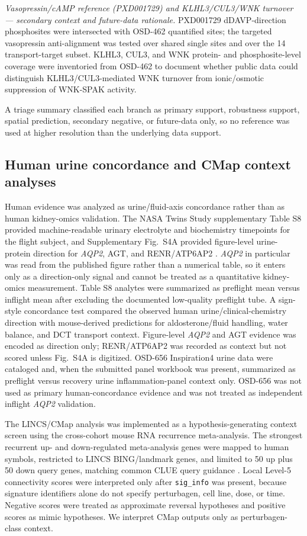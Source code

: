 \documentclass[11pt]{article}
\newcommand{\code}[1]{\texttt{#1}}
\newcommand{\gene}[1]{\textit{#1}}
\begin{document}
\emph{Vasopressin/cAMP reference (PXD001729) and KLHL3/CUL3/WNK turnover --- secondary context and future-data rationale.} PXD001729 dDAVP-direction phosphosites were intersected with OSD-462 quantified sites; the targeted vasopressin anti-alignment was tested over shared single sites and over the 14 transport-target subset. KLHL3, CUL3, and WNK protein- and phosphosite-level coverage were inventoried from OSD-462 to document whether public data could distinguish KLHL3/CUL3-mediated WNK turnover from ionic/osmotic suppression of WNK-SPAK activity.

A triage summary classified each branch as primary support, robustness support, spatial prediction, secondary negative, or future-data only, so no reference was used at higher resolution than the underlying data support.

\subsection{Human urine concordance and CMap context analyses}

Human evidence was analyzed as urine/fluid-axis concordance rather than as human kidney-omics validation. The NASA Twins Study supplementary Table S8 provided machine-readable urinary electrolyte and biochemistry timepoints for the flight subject, and Supplementary Fig.~S4A provided figure-level urine-protein direction for \gene{AQP2}, AGT, and RENR/ATP6AP2 \citep{garrettbakelman2019twins}. \gene{AQP2} in particular was read from the published figure rather than a numerical table, so it enters only as a direction-only signal and cannot be treated as a quantitative kidney-omics measurement. Table S8 analytes were summarized as preflight mean versus inflight mean after excluding the documented low-quality preflight tube. A sign-style concordance test compared the observed human urine/clinical-chemistry direction with mouse-derived predictions for aldosterone/fluid handling, water balance, and DCT transport context. Figure-level \gene{AQP2} and AGT evidence was encoded as direction only; RENR/ATP6AP2 was recorded as context but not scored unless Fig.~S4A is digitized. OSD-656 Inspiration4 urine data were cataloged and, when the submitted panel workbook was present, summarized as preflight versus recovery urine inflammation-panel context only. OSD-656 was not used as primary human-concordance evidence and was not treated as independent inflight \gene{AQP2} validation.

The LINCS/CMap analysis was implemented as a hypothesis-generating context screen using the cross-cohort mouse RNA recurrence meta-analysis. The strongest recurrent up- and down-regulated meta-analysis genes were mapped to human symbols, restricted to LINCS BING/landmark genes, and limited to 50 up plus 50 down query genes, matching common CLUE query guidance \citep{subramanian2017lincs}. Local Level-5 connectivity scores were interpreted only after \code{sig\_info} was present, because signature identifiers alone do not specify perturbagen, cell line, dose, or time. Negative scores were treated as approximate reversal hypotheses and positive scores as mimic hypotheses. We interpret CMap outputs only as perturbagen-class context.
\end{document}
